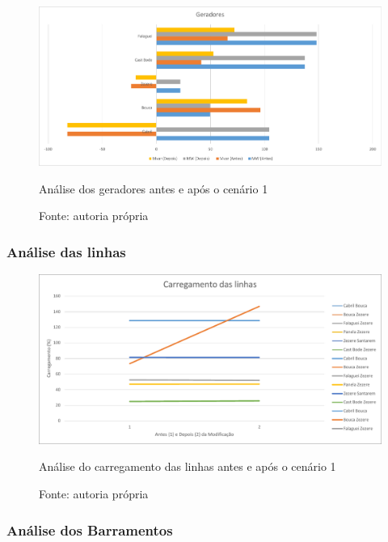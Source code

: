 \begin{figure}[H]
	\centering
	\captionsetup{width=\textwidth, font=footnotesize, textfont=bf}	
	\includegraphics[width=\linewidth]{img/geradores_caso1.pdf}
	\caption{Análise dos geradores antes e após o cenário 1}
	\vspace{-3.5mm}
	\caption*{Fonte: autoria própria}
	\label{fig:geradores_caso1}
\end{figure}


\subsubsection{Análise das linhas}

\begin{figure}[H]
	\centering
	\captionsetup{width=\textwidth, font=footnotesize, textfont=bf}	
	\includegraphics[width=0.9\linewidth]{img/carregamento_linhas_caso1.pdf}
	\caption{Análise do carregamento das linhas antes e após o cenário 1}
	\vspace{-3.5mm}
	\caption*{Fonte: autoria própria}
	\label{fig:carregamento_linhas_caso1}
\end{figure}

    
\subsubsection{Análise dos Barramentos}

